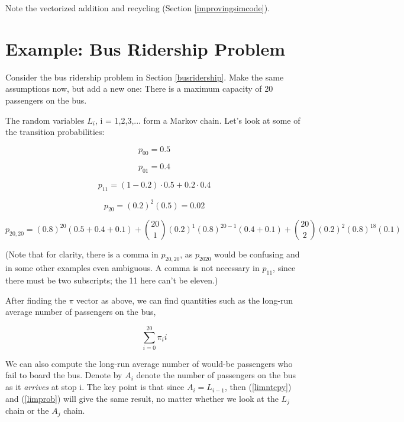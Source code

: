 Note the vectorized addition and recycling (Section
\ref{improvingsimcode}). 

\section{Example:  Bus Ridership Problem}

Consider the bus ridership problem in Section \ref{busridership}.  Make
the same assumptions now, but add a new one:  There is a maximum
capacity of 20 passengers on the bus.

The random variables $L_i$, i = 1,2,3,... form a Markov chain.  Let's
look at some of the transition probabilities:

\begin{equation}
p_{00} = 0.5 
\end{equation}

\begin{equation}
p_{01} = 0.4 
\end{equation}

\begin{equation}
p_{11} = (1-0.2) \cdot 0.5 + 0.2 \cdot 0.4
\end{equation}

\begin{equation}
p_{20} = (0.2)^2 (0.5) = 0.02
\end{equation}

\begin{equation}
p_{20,20} = (0.8)^{20} (0.5+0.4+0.1) + 
\binom{20}{1}
(0.2)^1 (0.8)^{20-1} (0.4 + 0.1) + 
\binom{20}{2}
(0.2)^2 (0.8)^{18} (0.1)
\end{equation}

(Note that for clarity, there is a comma in $p_{20,20}$, as $p_{2020}$
would be confusing and in some other examples even ambiguous.  A comma
is not necessary in $p_{11}$, since there must be two subscripts; the 11
here can't be eleven.)

After finding the $\pi$ vector as above, we can find quantities such as
the long-run average number of passengers on the bus,

\begin{equation}
\label{avgonbus}
\sum_{i=0}^{20} \pi_i i
\end{equation}

We can also compute the long-run average number of would-be passengers who
fail to board the bus.  Denote by $A_i$ denote the number of passengers
on the bus as it {\it arrives} at stop i. The key point is that since
$A_i = L_{i-1}$, then (\ref{limntcpy}) and (\ref{limprob}) will give the
same result, no matter whether we look at the $L_j$ chain or the $A_j$ chain.

